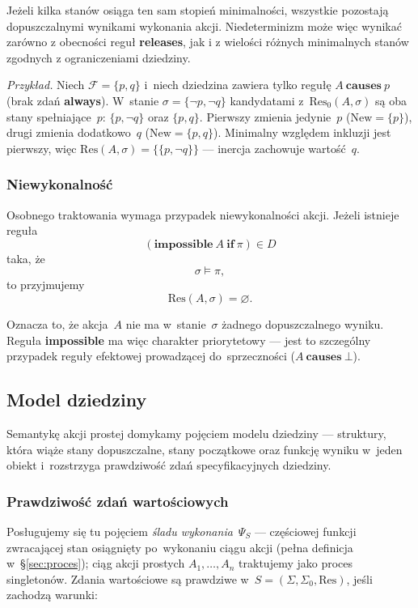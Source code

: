\documentclass[11pt,a4paper]{article}
\newcommand{\causes}{\textbf{causes}}
\newcommand{\always}{\textbf{always}}
\theoremstyle{definition}
\begin{document}
Jeżeli kilka stanów osiąga ten sam stopień minimalności, wszystkie pozostają dopuszczalnymi wynikami wykonania akcji. Niedeterminizm może więc wynikać zarówno z obecności reguł \textbf{releases}, jak i z wielości różnych minimalnych stanów zgodnych z ograniczeniami dziedziny.

\smallskip\noindent\emph{Przykład.}
Niech $\mathcal{F}=\{p,q\}$ i~niech dziedzina zawiera tylko regułę $A\ \causes\ p$
(brak zdań \always{}). W~stanie $\sigma=\{\neg p,\neg q\}$ kandydatami z~$\mathrm{Res}_0(A,\sigma)$
są oba stany spełniające~$p$: $\{p,\neg q\}$ oraz $\{p,q\}$. Pierwszy zmienia jedynie~$p$
($\mathrm{New}=\{p\}$), drugi zmienia dodatkowo~$q$ ($\mathrm{New}=\{p,q\}$). Minimalny
względem inkluzji jest pierwszy, więc $\mathrm{Res}(A,\sigma)=\{\{p,\neg q\}\}$ ---
inercja zachowuje wartość~$q$.

\subsubsection{Niewykonalność}

Osobnego traktowania wymaga przypadek niewykonalności akcji. Jeżeli istnieje reguła
\[
(\textbf{impossible}\ A\ \textbf{if}\ \pi)\in D
\]
taka, że
\[
\sigma \models \pi,
\]
to przyjmujemy
\[
\mathrm{Res}(A,\sigma)=\varnothing.
\]

Oznacza to, że akcja~$A$ nie ma w~stanie~$\sigma$ żadnego dopuszczalnego wyniku. Reguła \textbf{impossible} ma więc charakter priorytetowy --- jest to szczególny przypadek reguły efektowej prowadzącej do~sprzeczności ($A\ \causes\ \bot$).

\subsection{Model dziedziny}
\label{sec:model-jezyk-akcji}

Semantykę akcji prostej domykamy pojęciem modelu dziedziny --- struktury, która wiąże stany dopuszczalne, stany początkowe oraz funkcję wyniku w~jeden obiekt i~rozstrzyga prawdziwość zdań specyfikacyjnych dziedziny.

\subsubsection{Prawdziwość zdań wartościowych}
\label{sec:prawdziwosc-zdan-wartosciowych}

Posługujemy się tu pojęciem \emph{śladu wykonania}~$\Psi_S$ --- częściowej funkcji zwracającej stan osiągnięty po~wykonaniu ciągu akcji (pełna definicja w~\S\ref{sec:proces}); ciąg akcji prostych $A_1,\dots,A_n$ traktujemy jako proces singletonów. Zdania wartościowe są prawdziwe w~$S = (\Sigma, \Sigma_0, \mathrm{Res})$, jeśli zachodzą warunki:
\end{document}
